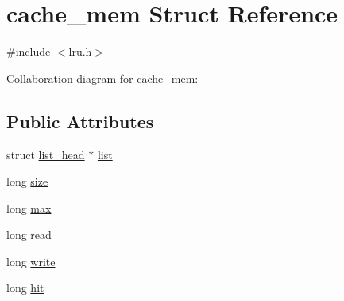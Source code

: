 \hypertarget{structcache__mem}{\section{cache\+\_\+mem Struct Reference}
\label{structcache__mem}
}


{\ttfamily \#include $<$lru.\+h$>$}



Collaboration diagram for cache\+\_\+mem\+:
\subsection*{Public Attributes}
\begin{DoxyCompactItemize}
\item 
struct \hyperlink{structlist__head}{list\+\_\+head} $\ast$ \hyperlink{structcache__mem_a785dde86afb87f8825779f50e29d6bd7}{list}
\item 
long \hyperlink{structcache__mem_a58c6a91c40d59398a3ed18daccc448fc}{size}
\item 
long \hyperlink{structcache__mem_aca41dfab3073387e6c6063457a17f616}{max}
\item 
long \hyperlink{structcache__mem_af64061b621392a1872f5cb92dde7dc7c}{read}
\item 
long \hyperlink{structcache__mem_adb5a0315176779908235c7ed3e41ec57}{write}
\item 
long \hyperlink{structcache__mem_a2b8742701cf4beaff0639d36d52209d9}{hit}
\end{DoxyCompactItemize}


